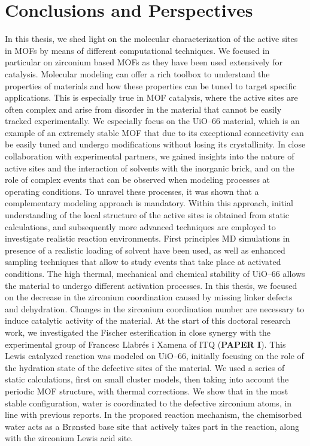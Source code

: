 \graphicspath{{figures/chapter4/}}
\renewcommand\evenpagerightmark{{\scshape\small Conclusions and perspectives}} 
\renewcommand\oddpageleftmark{{\scshape\small Chapter 4}}


\hyphenation{}

\chapter[Conclusions and perspectives]%
{Conclusions and Perspectives}
\label{ch4}
In this thesis, we shed light on the molecular characterization of the active sites in MOFs by means of different computational techniques. We focused in particular on zirconium based MOFs as they have been used extensively for catalysis. Molecular modeling can offer a rich toolbox to understand the properties of materials and how these properties can be tuned to target specific applications. This is especially true in MOF catalysis, where the active sites are often complex and arise from disorder in the material that cannot be easily tracked experimentally. We especially focus on the UiO--66 material, which is an example of an extremely stable MOF that due to its exceptional connectivity can be easily tuned and undergo modifications without losing its crystallinity. In close collaboration with experimental partners, we gained insights into the nature of active sites and the interaction of solvents with the inorganic brick, and on the role of complex events that can be observed when modeling processes at operating conditions. To unravel these processes, it was shown that a complementary modeling approach is mandatory. Within this approach, initial understanding of the local structure of the active sites is obtained from static calculations, and subsequently more advanced techniques are employed to investigate realistic reaction environments. First principles MD simulations in presence of a realistic loading of solvent have been used, as well as enhanced sampling techniques that allow to study events that take place at activated conditions.
\npar
The high thermal, mechanical and chemical stability of UiO--66 allows the material to undergo different activation processes. In this thesis, we focused on the decrease in the zirconium coordination caused by missing linker defects and dehydration. Changes in the zirconium coordination number are necessary to induce catalytic activity of the material.
\npar
At the start of this doctoral research work, we investigated the Fischer esterification in close synergy with the experimental group of Francesc Llabr\'es i Xamena of ITQ  (\textbf{PAPER I}). This Lewis catalyzed reaction was modeled on UiO--66, initially focusing on the role of the hydration state of the defective sites of the material. We used a series of static calculations, first on small cluster models, then taking into account the periodic MOF structure, with thermal corrections. We show that in the most stable configuration, water is coordinated to the defective zirconium atoms, in line with previous reports. In the proposed reaction mechanism, the chemisorbed water acts as a Br\o{}nsted base site that actively takes part in the reaction, along with the zirconium Lewis acid site. 
